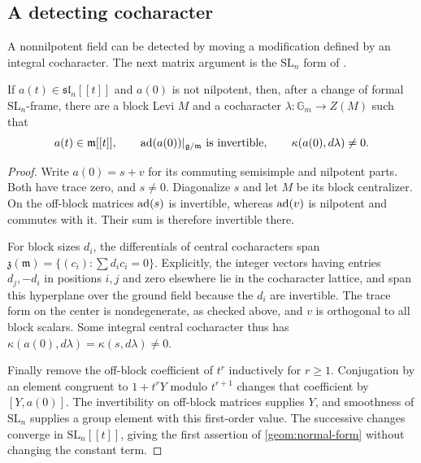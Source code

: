 \subsection{A detecting cocharacter}

A nonnilpotent field can be detected by moving a modification defined
by an integral cocharacter.  The next matrix argument is the
$\mathrm{SL}_n$ form of \cite[Lemma~3.2]{CT}.

\begin{lemma}\label{geom:cocharacter}
If $a(t)\in\mathfrak{sl}_n[[t]]$ and $a(0)$ is not nilpotent, then,
after a change of formal $\mathrm{SL}_n$-frame, there are a block Levi
$M$ and a cocharacter $\lambda:\mathbb G_m\to Z(M)$ such that
\begin{equation}\label{geom:normal-form}
 a(t)\in\mathfrak m[[t]],\qquad
 \operatorname{ad}(a(0))|_{\mathfrak g/\mathfrak m}\text{ is invertible},\qquad
                    \kappa(a(0),d\lambda)\ne0.
\end{equation}
\end{lemma}

\begin{proof}
Write $a(0)=s+v$ for its commuting semisimple and nilpotent parts.
Both have trace zero, and $s\ne0$.  Diagonalize $s$ and let $M$ be
its block centralizer.  On the off-block matrices $\operatorname{ad}(s)$ is
invertible, whereas $\operatorname{ad}(v)$ is nilpotent and commutes with it.
Their sum is therefore invertible there.

For block sizes $d_i$, the differentials of central cocharacters span
$\mathfrak z(\mathfrak m)=\{(c_i):\sum d_ic_i=0\}$.  Explicitly,
the integer vectors having entries $d_j,-d_i$ in positions $i,j$
and zero elsewhere lie in the cocharacter lattice, and span this
hyperplane over the ground field because the $d_i$ are invertible.
The trace form on the center is nondegenerate, as checked above, and
$v$ is orthogonal to all block scalars.  Some integral central
cocharacter thus has $\kappa(a(0),d\lambda)=\kappa(s,d\lambda)\ne0$.

Finally remove the off-block coefficient of $t^r$ inductively for
$r\ge1$.  Conjugation by an element congruent to $1+t^rY$ modulo
$t^{r+1}$ changes that coefficient by $[Y,a(0)]$.  The invertibility
on off-block matrices supplies $Y$, and smoothness of $\mathrm{SL}_n$
supplies a group element with this first-order value.  The successive
changes converge in $\mathrm{SL}_n[[t]]$, giving the first assertion
of \eqref{geom:normal-form} without changing the constant term.
\end{proof}

